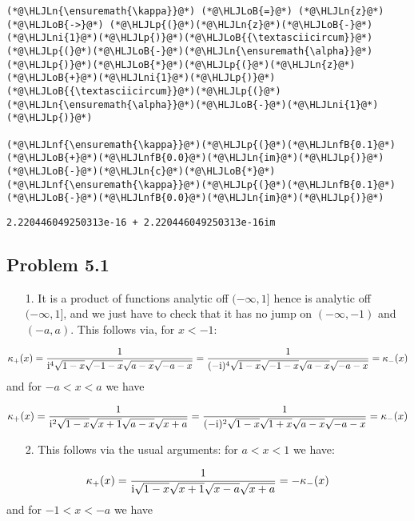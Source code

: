 \documentclass[12pt,landscape]{article}
\newcommand{\HLJLn}[1]{#1}
\newcommand{\HLJLnf}[1]{\textcolor[RGB]{66,102,213}{#1}}
\newcommand{\HLJLnfB}[1]{\textcolor[RGB]{59,151,46}{#1}}
\newcommand{\HLJLni}[1]{\textcolor[RGB]{59,151,46}{#1}}
\newcommand{\HLJLoB}[1]{\textcolor[RGB]{102,102,102}{\textbf{#1}}}
\newcommand{\HLJLp}[1]{#1}
\def\I{ {\rm i} }
\begin{document}
{\begin{lstlisting}
(*@\HLJLn{\ensuremath{\kappa}}@*) (*@\HLJLoB{=}@*) (*@\HLJLn{z}@*) (*@\HLJLoB{->}@*) (*@\HLJLp{(}@*)(*@\HLJLn{z}@*)(*@\HLJLoB{-}@*)(*@\HLJLni{1}@*)(*@\HLJLp{)}@*)(*@\HLJLoB{{\textasciicircum}}@*)(*@\HLJLp{(}@*)(*@\HLJLoB{-}@*)(*@\HLJLn{\ensuremath{\alpha}}@*)(*@\HLJLp{)}@*)(*@\HLJLoB{*}@*)(*@\HLJLp{(}@*)(*@\HLJLn{z}@*)(*@\HLJLoB{+}@*)(*@\HLJLni{1}@*)(*@\HLJLp{)}@*)(*@\HLJLoB{{\textasciicircum}}@*)(*@\HLJLp{(}@*)(*@\HLJLn{\ensuremath{\alpha}}@*)(*@\HLJLoB{-}@*)(*@\HLJLni{1}@*)(*@\HLJLp{)}@*)

(*@\HLJLnf{\ensuremath{\kappa}}@*)(*@\HLJLp{(}@*)(*@\HLJLnfB{0.1}@*)(*@\HLJLoB{+}@*)(*@\HLJLnfB{0.0}@*)(*@\HLJLn{im}@*)(*@\HLJLp{)}@*)(*@\HLJLoB{-}@*)(*@\HLJLn{c}@*)(*@\HLJLoB{*}@*)(*@\HLJLnf{\ensuremath{\kappa}}@*)(*@\HLJLp{(}@*)(*@\HLJLnfB{0.1}@*)(*@\HLJLoB{-}@*)(*@\HLJLnfB{0.0}@*)(*@\HLJLn{im}@*)(*@\HLJLp{)}@*)
\end{lstlisting}

\begin{lstlisting}
2.220446049250313e-16 + 2.220446049250313e-16im
\end{lstlisting}


\subsection{Problem 5.1}
\begin{itemize}
\item[1. ] It is a product of functions analytic off $(-\infty,1]$ hence is analytic off $(-\infty,1]$, and we just have to check that it has no jump on $(-\infty,-1)$ and $(-a,a)$. This follows via, for $x < -1$:

\end{itemize}
\begin{align*}
\kappa_+(x) = {1 \over \I^4 \sqrt{1-x}\sqrt{-1-x}\sqrt{a-x}\sqrt{-a-x}} = {1 \over (-\I)^4 \sqrt{1-x}\sqrt{-1-x}\sqrt{a-x}\sqrt{-a-x}} = \kappa_-(x)
\end{align*}
and for $-a < x < a$ we have

\[
\kappa_+(x) = {1 \over \I^2 \sqrt{1-x}\sqrt{x+1}\sqrt{a-x}\sqrt{x+a}} = {1 \over (-\I)^2 \sqrt{1-x}\sqrt{1+x}\sqrt{a-x}\sqrt{-a-x}} = \kappa_-(x)
\]
\begin{itemize}
\item[2. ] This follows via the usual arguments: for $a < x < 1$ we have:

\end{itemize}
\[
\kappa_+(x) = {1 \over \I \sqrt{1-x}\sqrt{x+1}\sqrt{x-a}\sqrt{x+a}} =  -\kappa_-(x)
\]
and for $-1 < x < -a$ we have

}
\end{document}
